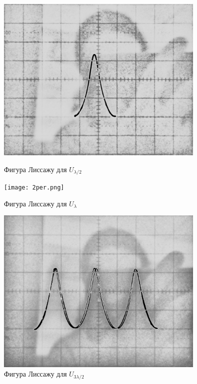 \documentclass[a4paper,12pt]{article} %
\begin{document}
\begin{figure}
\centering
\begin{minipage}{0.49\textwidth}
\includegraphics[width=0.9\textwidth]{1per.png}
\caption{Фигура Лиссажу для $U_{\lambda/2}$}
\label{fig:per1}
\end{minipage}
\begin{minipage}{0.49\textwidth}
\texttt{[image: 2per.png]}
\caption{Фигура Лиссажу для $U_{\lambda}$}
\label{fig:per2}
\end{minipage}
\medskip\medskip
\begin{minipage}{0.49\textwidth}
\includegraphics[width=0.9\textwidth]{3per.png}
\caption{Фигура Лиссажу для $U_{3\lambda/2}$}
\label{fig:per3}
\end{minipage}
\end{figure}
\end{document}

